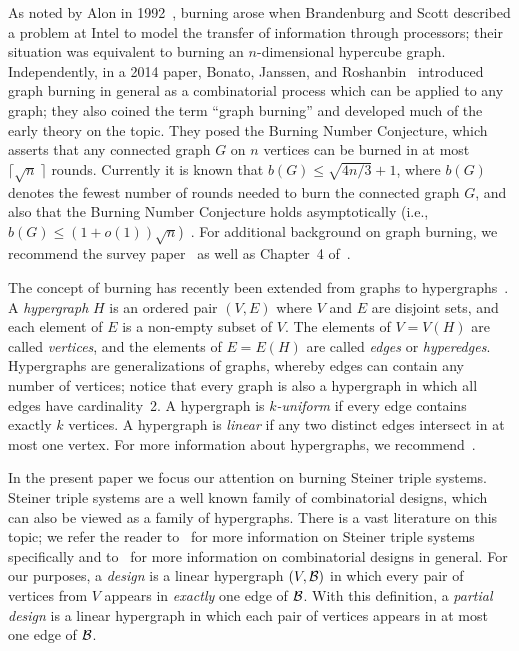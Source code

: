 \documentclass[12pt]{article}
\theoremstyle{definition}
\numberwithin{table}{section}
\begin{document}
As noted by Alon in 1992~\cite{Alon1992},
burning arose when Brandenburg and Scott described a problem at Intel to model the transfer of information through processors; their situation was equivalent to burning an $n$-dimensional hypercube graph.  
Independently, in a 2014 paper, Bonato, Janssen, and Roshanbin~\cite{BJR_WAW,BJR_InternetMath} introduced graph burning in general as a combinatorial process which can be applied to any graph; they also coined the term ``graph burning'' and developed much of the early theory on the topic. 
They posed the Burning Number Conjecture, which asserts that any connected graph $G$ on $n$ vertices can be burned in at most $\bigl\lceil \sqrt{n}\: \bigr\rceil$ rounds.
Currently it is known that $b(G) \leq \sqrt{4n/3}+1$, 
where $b(G)$ denotes the fewest number of rounds needed to burn the connected graph $G$,
and also that the Burning Number Conjecture holds asymptotically (i.e., $b(G) \leq (1+o(1)) \sqrt{n}$)~\cite{BBBCKPR_2023,NT_2024}.
For additional background on graph burning, we recommend the survey paper~\cite{Bonato_survey} as well as Chapter~4 of~\cite{Bonato_book}.

The concept of burning has recently been extended from graphs to hypergraphs~\cite{introducing_hyp_burn,mythesis}.
A \emph{hypergraph} $H$ is an ordered pair $(V, E)$ where $V$ and $E$ are disjoint sets, 
and each element of $E$ is a non-empty subset of $V$. The elements of $V=V(H)$ are called \emph{vertices}, and the elements of $E=E(H)$ are called \emph{edges} or \emph{hyperedges}. Hypergraphs are generalizations of graphs, whereby edges can contain any number of vertices; notice that every graph is also a hypergraph in which all edges have cardinality~2.
A hypergraph is $k$\emph{-uniform} if every edge contains exactly $k$ vertices. 
A hypergraph is \emph{linear} if any two distinct edges intersect in at most one vertex.
For more information about hypergraphs, we recommend~\cite{bahm_sanj,hypergraph_text,conn_in_hyp}. 

In the present paper we focus our attention on burning Steiner triple systems.  Steiner triple systems are a well known family of combinatorial designs, which can also be viewed as a family of hypergraphs.
There is a vast literature on this topic; we refer the reader to~\cite{triple_systems_text} for more information on Steiner triple systems specifically and to~\cite{designs_handbook,design_text} for more information on combinatorial designs in general.
For our purposes, a {\em design} is a linear hypergraph  $(V,\cal{B})$ 
in which every pair of vertices from $V$ 
appears in {\em exactly} one edge of $\cal{B}$. 
With this definition, a {\em partial design} is a linear hypergraph in which each pair of vertices appears in at most one edge of $\cal{B}$.
\end{document}
